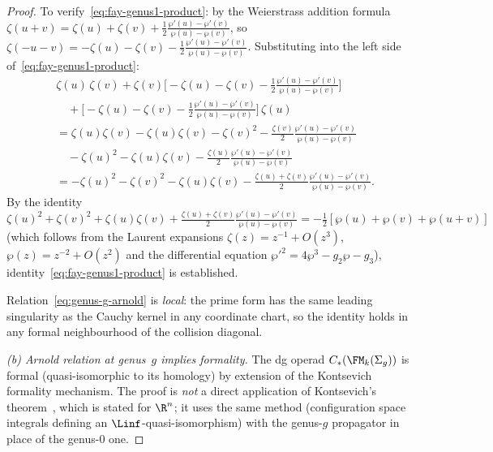 \begin{proof}
To verify~\eqref{eq:fay-genus1-product}: by the Weierstrass
addition formula $\zeta(u+v) = \zeta(u) + \zeta(v) +
\frac{1}{2}\frac{\wp'(u) - \wp'(v)}{\wp(u) - \wp(v)}$, so
$\zeta(-u-v) = -\zeta(u) - \zeta(v) -
\frac{1}{2}\frac{\wp'(u) - \wp'(v)}{\wp(u) - \wp(v)}$.
Substituting into the left side of~\eqref{eq:fay-genus1-product}:
\begin{align*}
 &\zeta(u)\,\zeta(v)
 + \zeta(v)\bigl[-\zeta(u) - \zeta(v)
 - \tfrac{1}{2}\tfrac{\wp'(u) - \wp'(v)}{\wp(u) - \wp(v)}\bigr] \\
 &\quad{}+ \bigl[-\zeta(u) - \zeta(v)
 - \tfrac{1}{2}\tfrac{\wp'(u) - \wp'(v)}{\wp(u) - \wp(v)}\bigr]
 \,\zeta(u) \\
 &= \zeta(u)\zeta(v) - \zeta(u)\zeta(v) - \zeta(v)^2
 - \tfrac{\zeta(v)}{2}\tfrac{\wp'(u)-\wp'(v)}{\wp(u)-\wp(v)} \\
 &\quad{}- \zeta(u)^2 - \zeta(u)\zeta(v)
 - \tfrac{\zeta(u)}{2}\tfrac{\wp'(u)-\wp'(v)}{\wp(u)-\wp(v)} \\
 &= -\zeta(u)^2 - \zeta(v)^2 - \zeta(u)\zeta(v)
 - \tfrac{\zeta(u)+\zeta(v)}{2}
 \tfrac{\wp'(u)-\wp'(v)}{\wp(u)-\wp(v)}.
\end{align*}
By the identity $\zeta(u)^2 + \zeta(v)^2 + \zeta(u)\zeta(v)
+ \tfrac{\zeta(u)+\zeta(v)}{2}
\tfrac{\wp'(u)-\wp'(v)}{\wp(u)-\wp(v)}
= -\tfrac{1}{2}[\wp(u)+\wp(v)+\wp(u+v)]$
(which follows from the Laurent expansions
$\zeta(z) = z^{-1} + O(z^3)$, $\wp(z) = z^{-2} + O(z^2)$
and the differential equation $\wp'^2 = 4\wp^3 - g_2 \wp - g_3$),
identity~\eqref{eq:fay-genus1-product} is established.

Relation~\eqref{eq:genus-g-arnold} is \emph{local}: the prime
form has the same leading singularity as the Cauchy kernel in any
coordinate chart, so the identity holds in any formal neighbourhood
of the collision diagonal.

\medskip
\emph{(b) Arnold relation at genus~$g$ implies formality.}
The dg operad $C_\ast(\FM_k(\Sigma_g))$ is formal
(quasi-isomorphic to its homology) by extension of the Kontsevich
formality mechanism. The proof is \emph{not} a direct application
of Kontsevich's theorem~\cite{Kon03}, which is stated for
$\R^n$; it uses the same method (configuration space integrals
defining an $\Linf$-quasi-isomorphism) with the genus-$g$
propagator in place of the genus-$0$ one.


\end{proof}
